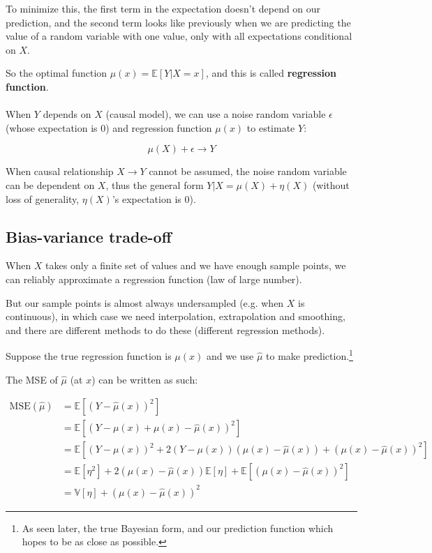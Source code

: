 \documentclass{article}
\begin{document}
To minimize this, the first term in the expectation doesn't depend on our prediction, and the second term looks like previously when we are predicting the value of a random variable with one value, only with all expectations conditional on $X$.

So the optimal function $\mu(x) = \mathbb{E}[Y | X = x]$, and this is called \textbf{regression function}.
\\
\\
When $Y$ depends on $X$ (causal model), we can use a noise random variable $\epsilon$ (whose expectation is 0) and regression function $\mu(x)$ to estimate $Y$:

$$
\mu(X) + \epsilon \to Y
$$

When causal relationship $X \to Y$ cannot be assumed, the noise random variable can be dependent on $X$, thus the general form $Y|X = \mu(X) + \eta(X)$ (without loss of generality, $\eta(X)$'s expectation is 0).

\subsection{Bias-variance trade-off}

When $X$ takes only a finite set of values and we have enough sample points, we can reliably approximate a regression function (law of large number).

But our sample points is almost always undersampled (e.g. when $X$ is continuous), in which case we need interpolation, extrapolation and smoothing, and there are different methods to do these (different regression methods).

Suppose the true regression function is $\mu(x)$ and we use $\hat{\mu}$ to make prediction.\footnote{As seen later, the true Bayesian form, and our prediction function which hopes to be as close as possible.}

The MSE of $\hat{\mu}$ (at $x$) can be written as such:

\begin{align*}
\text{MSE}(\hat{\mu}) &= \mathbb{E}[(Y - \hat{\mu}(x))^2]                     \\
                      &= \mathbb{E}[(Y - \mu(x) + \mu(x) - \hat{\mu}(x))^2]   \\
                      &= \mathbb{E}[(Y - \mu(x))^2 + 2 (Y - \mu(x)) (\mu(x) - \hat{\mu}(x)) + (\mu(x) - \hat{\mu}(x))^2] \\
                      &= \mathbb{E}[\eta^2] + 2 (\mu(x) - \hat{\mu}(x)) \mathbb{E}[\eta] + \mathbb{E}[(\mu(x) - \hat{\mu}(x))^2] \\
                      &= \mathbb{V}[\eta] + (\mu(x) - \hat{\mu}(x))^2
\end{align*}
\end{document}
